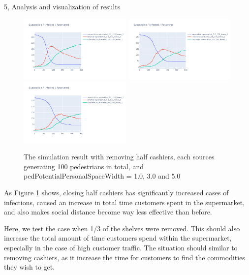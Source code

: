 \documentclass[10pt,a4paper]{article}
\begin{document}
\begin{task}{5, Analysis and visualization of results}
\begin{figure}[H]
    \includegraphics[width=5.5cm]{images/bonus1_1.0.png}
    \includegraphics[width=5.5cm]{images/bonus1_3.0.png}
    \includegraphics[width=5.5cm]{images/bonus1_5.0.png}
    \centering
    \caption{The simulation result with removing half cashiers, each sources generating 100 pedestrians in total, and pedPotentialPersonalSpaceWidth = 1.0, 3.0 and 5.0}
    \label{bonus1-2}
\end{figure}

As Figure \ref{bonus1-2} shows, closing half cashiers has significantly increased cases of infections, caused an increase in total time customers spent in the supermarket, and also makes social distance become way less effective than before.


\bigskip


Here, we test the case when 1/3 of the shelves were removed. This should also increase the total amount of time customers spend within the supermarket, especially in the case of high customer traffic. The situation should similar to removing cashiers, as it increase the time for customers to find the commodities they wish to get.



\end{task}
\end{document}
